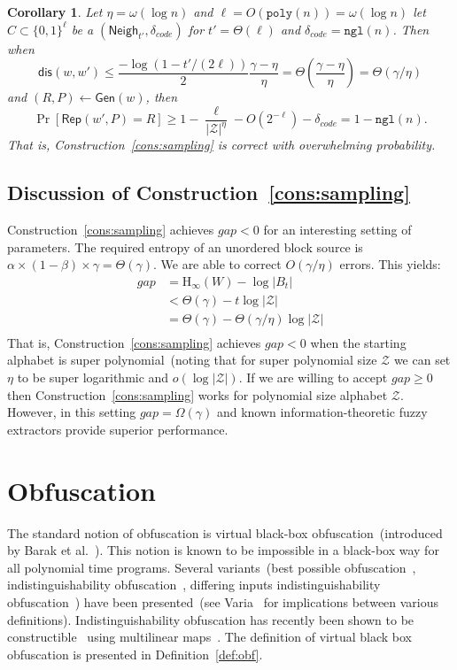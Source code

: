 \documentclass[11pt]{article}
\newcommand{\defref}[1]{\mbox{Definition~\ref{#1}}}
\newcommand{\consref}[1]{\mbox{Construction~\ref{#1}}}
\newcommand{\class}[1]{{\ensuremath{\mathsf{#1}}}}
\newcommand{\gen}{\ensuremath{\class{Gen}}\xspace}
\newcommand{\rep}{\ensuremath{\class{Rep}}\xspace}
\newcommand{\zo}{\ensuremath{\{0, 1\}}}
\newcommand{\neigh}{\ensuremath{\class{Neigh}}\xspace}
\newcommand{\dis}{\ensuremath{\mathsf{dis}}}
\newcommand{\poly}{\ensuremath{\mathtt{poly}}\xspace}
\newcommand{\ngl}{\ensuremath{\mathtt{ngl}}\xspace}
\newcommand{\Hoo}{\mathrm{H}_\infty}
\newtheorem{corollary}[theorem]{Corollary}
\begin{document}
\begin{corollary}
Let $\eta= \omega(\log n)$ and $\ell = O(\poly(n)) = \omega(\log n)$ let $C\subset\zo^\ell$ be a $(\neigh_{t'}, \delta_{code})$ for $t' = \Theta(\ell)$ and $\delta_{code} = \ngl(n)$.  Then when
\[
\dis(w, w')\le \frac{-\log(1-t'/(2\ell))}{2}\frac{\gamma-\eta}{\eta} = \Theta(\frac{\gamma-\eta}{\eta}) = \Theta(\gamma/\eta)
\]
and $(R, P)\leftarrow \gen(w)$, then
\[
\Pr[\rep( w', P) = R] \geq 1-\frac{\ell}{|\mathcal{Z}|^\eta} - O(2^{-\ell}) -\delta_{code}= 1-\ngl(n).
\]
That is, \consref{cons:sampling} is correct with overwhelming probability.

\end{corollary}
\subsection{Discussion of \consref{cons:sampling}}
\consref{cons:sampling} achieves $gap<0$ for an interesting setting of parameters.  The required entropy of  an unordered block source is $\alpha\times (1-\beta )\times \gamma = \Theta(\gamma)$.  We are able to correct $O(\gamma/\eta)$ errors.
This yields:
\begin{align*}
gap &= \Hoo(W) -\log |B_t| \\
&< \Theta(\gamma)- t \log |\mathcal{Z}|\\
&= \Theta(\gamma) - \Theta(\gamma/\eta) \log |\mathcal{Z}|\\
\end{align*}
That is, \consref{cons:sampling} achieves $gap<0$ when the starting alphabet is super polynomial~(noting that for super polynomial size $\mathcal{Z}$ we can set $\eta$ to be super logarithmic and $o(\log |\mathcal{Z}|)$.  If we are willing to accept $gap\geq 0$ then \consref{cons:sampling} works for polynomial size alphabet $\mathcal{Z}$.  However, in this setting $gap =\Omega(\gamma)$ and known information-theoretic fuzzy extractors provide superior performance.



\appendix
\section{Obfuscation}
\label{sec:obfuscation}
The standard notion of obfuscation is virtual black-box obfuscation~(introduced by Barak et al.~\cite{barak2001possibility}).  This notion is known to be impossible in a black-box way for all polynomial time programs.  Several variants~(best possible obfuscation~\cite{goldwasser2007best}, indistinguishability obfuscation~\cite{barak2001possibility}, differing inputs indistinguishability obfuscation~\cite{barak2001possibility}) have been presented~(see Varia~\cite{varia2010studies} for implications between various definitions).  Indistinguishability obfuscation has recently been shown to be constructible~\cite{garg2013candidate} using multilinear maps~\cite{garg2013multilinear}.  The definition of virtual black box obfuscation is presented in \defref{def:obf}.
\end{document}
